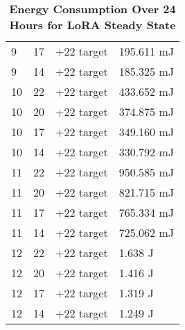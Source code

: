 \begin{table*}[ht]
\begin{tabularx}{\columnwidth}{l l l l}
        9 & 17 & +22 target & 195.611 mJ \\
        9 & 14 & +22 target & 185.325 mJ \\
        10 & 22 & +22 target & 433.652 mJ \\
        10 & 20 & +22 target & 374.875 mJ \\
        10 & 17 & +22 target & 349.160 mJ \\
        10 & 14 & +22 target & 330.792 mJ \\
        11 & 22 & +22 target & 950.585 mJ \\
        11 & 20 & +22 target & 821.715 mJ \\
        11 & 17 & +22 target & 765.334 mJ \\
        11 & 14 & +22 target & 725.062 mJ \\
        12 & 22 & +22 target & 1.638 J \\
        12 & 20 & +22 target & 1.416 J \\
        12 & 17 & +22 target & 1.319 J \\
        12 & 14 & +22 target & 1.249 J \\
        \bottomrule
    \end{tabularx}
    \caption{\textbf{Energy Consumption Over 24 Hours for LoRA Steady State}}
    \label{tab:lora_power_revised}
\end{table*}